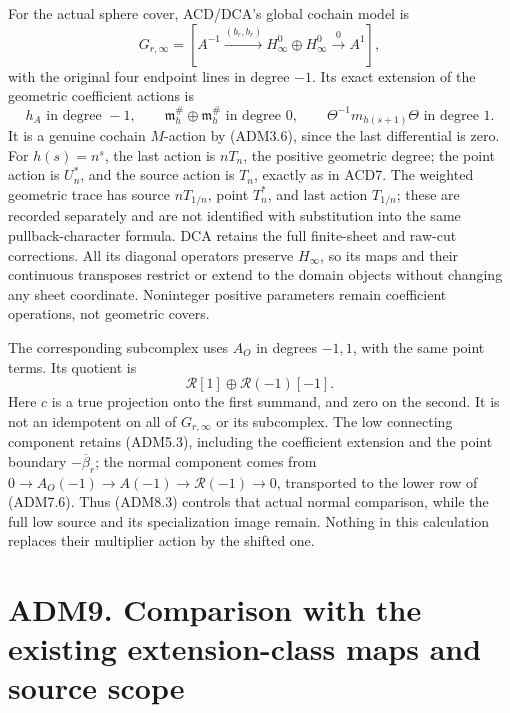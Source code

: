 For the actual sphere cover, ACD/DCA's global cochain model is \[
G_{r,\infty}=
[A^{-1}\xrightarrow{(b_r,b_r)}
H_\infty^0\oplus H_\infty^0\xrightarrow0 A^1],
\tag{ADM8.4}
\] with the original four endpoint lines in degree \(-1\). Its exact
extension of the geometric coefficient actions is \[
h_A\text{ in degree }-1,\qquad
\mathfrak m_h^\#\oplus\mathfrak m_h^\#\text{ in degree }0,\qquad
\Theta^{-1}m_{h(s+1)}\Theta\text{ in degree }1.
\tag{ADM8.5}
\] It is a genuine cochain \(M\)-action by (ADM3.6), since the last
differential is zero. For \(h(s)=n^s\), the last action is \(nT_n\), the
positive geometric degree; the point action is \(U_n^*\), and the source
action is \(T_n\), exactly as in ACD7. The weighted geometric trace has
source \(nT_{1/n}\), point \(T_n^*\), and last action \(T_{1/n}\); these
are recorded separately and are not identified with substitution into
the same pullback-character formula. DCA retains the full finite-sheet
and raw-cut corrections. All its diagonal operators preserve
\(H_\infty\), so its maps and their continuous transposes restrict or
extend to the domain objects without changing any sheet coordinate.
Noninteger positive parameters remain coefficient operations, not
geometric covers.

The corresponding subcomplex uses \(A_O\) in degrees \(-1,1\), with the
same point terms. Its quotient is \[
\mathcal R[1]\oplus\mathcal R(-1)[-1].
\tag{ADM8.6}
\] Here \(c\) is a true projection onto the first summand, and zero on
the second. It is not an idempotent on all of \(G_{r,\infty}\) or its
subcomplex. The low connecting component retains (ADM5.3), including the
coefficient extension and the point boundary \(-\overline\beta_r\); the
normal component comes from
\(0\to A_O(-1)\to A(-1)\to\mathcal R(-1)\to0\), transported to the lower
row of (ADM7.6). Thus (ADM8.3) controls that actual normal comparison,
while the full low source and its specialization image remain. Nothing
in this calculation replaces their multiplier action by the shifted one.

\section{ADM9. Comparison with the existing extension-class maps and
source
scope}\label{adm9.-comparison-with-the-existing-extension-class-maps-and-source-scope}

